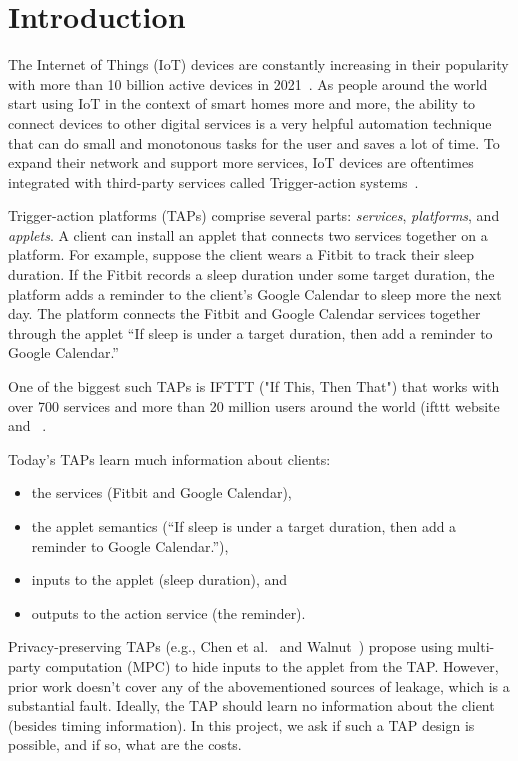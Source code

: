 \section{Introduction}
\label{sec:intro}

The Internet of Things (IoT) devices are constantly increasing in their popularity with more than 10 billion
active devices in 2021~\cite{DBLP:webpage/Bojan/IoTstats}. As people around the world start using IoT
in the context of smart homes more and more, the ability to connect devices to other digital services is a
very helpful automation technique that can do small and monotonous tasks for the user and saves a lot
of time. To expand their network and support more services, IoT devices are oftentimes integrated 
with third-party services called Trigger-action systems~\cite{DBLP:journals/access/XuZZCDG19,DBLP:conf/chi/UrHBLMPSL16}.

Trigger-action platforms (TAPs) comprise several parts:
\emph{services}, \emph{platforms}, and \emph{applets}. A client can install an
applet that connects two services together on a platform. For example, suppose
the client wears a Fitbit to track their sleep duration. If the Fitbit records a
sleep duration under some target duration, the platform adds a reminder to
the client's Google Calendar to sleep more the next day. The platform connects
the Fitbit and Google Calendar services together through the applet ``If sleep
is under a target duration, then add a reminder to Google Calendar.''  

One of the biggest such TAPs is IFTTT ("If This, Then That") that works with
over 700 services and more than 20 million users around the world (ifttt website and ~\cite{DBLP:conf/spChenCWSCF21}.

Today's TAPs learn much information about clients:
\begin{itemize}[leftmargin=*]
  \item the services (Fitbit and Google Calendar),
  \item the applet semantics (``If sleep is under a target duration, then add a
    reminder to Google Calendar.''),
  \item inputs to the applet (sleep duration), and
  \item outputs to the action service (the reminder).
\end{itemize}


Privacy-preserving TAPs (e.g., Chen et al.~\cite{DBLP:conf/sp/ChenCWSCF21} and
Walnut~\cite{DBLP:journals/corr/abs-2009-12447}) propose using multi-party
computation (MPC) to hide inputs to the applet from the TAP. However, prior work
doesn't cover any of the abovementioned sources of leakage, which is a substantial fault. Ideally,
the TAP should learn no information about the client (besides timing
information). In this project, we ask if such a TAP design is possible, and if
so, what are the costs. 
